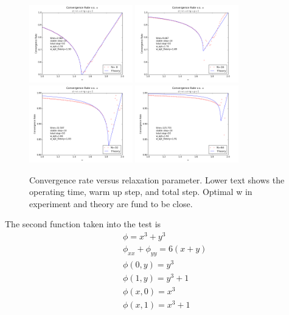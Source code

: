 \documentclass[12pt]{article}
\begin{document}
\begin{figure}[h!]
	\begin{center}
		\includegraphics[width=0.4\textwidth]{Conv_rate_N_8.png}
		\includegraphics[width=0.4\textwidth]{Conv_rate_N_16.png}
		\includegraphics[width=0.4\textwidth]{Conv_rate_N_32.png}
		\includegraphics[width=0.4\textwidth]{Conv_rate_N_64.png}
		\caption{Convergence rate versus relaxation parameter. Lower text shows the operating time, warm up step, and total step. Optimal w in experiment and theory are fund to be close.}
		\label{fig2}
	\end{center}
\end{figure}
The second function taken into the test is
\begin{eqnarray}
&&\phi=x^3+y^3\nonumber\\
&&\phi_{xx}+\phi_{yy}=6(x+y)\nonumber\\
&&\phi(0,y)=y^3\nonumber\\
&&\phi(1,y)=y^3+1\nonumber\\
&&\phi(x,0)=x^3\nonumber\\
&&\phi(x,1)=x^3+1
\end{eqnarray} 
\end{document}
